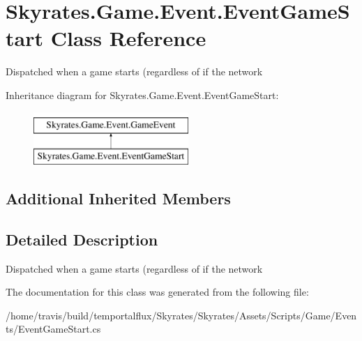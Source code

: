 \hypertarget{class_skyrates_1_1_game_1_1_event_1_1_event_game_start}{\section{Skyrates.\-Game.\-Event.\-Event\-Game\-Start Class Reference}
\label{class_skyrates_1_1_game_1_1_event_1_1_event_game_start}
}


Dispatched when a game starts (regardless of if the network  


Inheritance diagram for Skyrates.\-Game.\-Event.\-Event\-Game\-Start\-:\begin{figure}[H]
\begin{center}
\leavevmode
\includegraphics[height=2.000000cm]{class_skyrates_1_1_game_1_1_event_1_1_event_game_start}
\end{center}
\end{figure}
\subsection*{Additional Inherited Members}


\subsection{Detailed Description}
Dispatched when a game starts (regardless of if the network 



The documentation for this class was generated from the following file\-:\begin{DoxyCompactItemize}
\item 
/home/travis/build/temportalflux/\-Skyrates/\-Skyrates/\-Assets/\-Scripts/\-Game/\-Events/Event\-Game\-Start.\-cs\end{DoxyCompactItemize}
